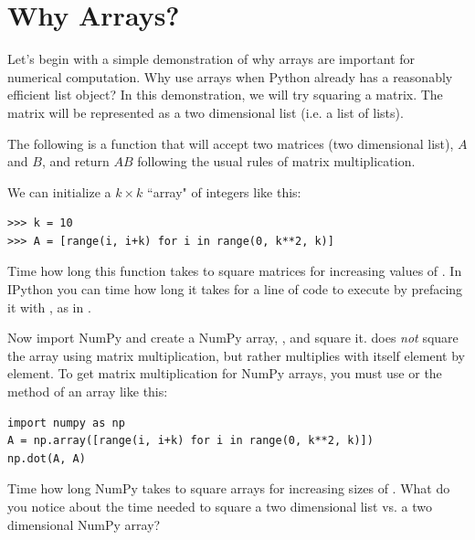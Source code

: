 \label{lab:NumPyArrays}

\section*{Why Arrays?}
Let's begin with a simple demonstration of why arrays are important for numerical computation.
Why use arrays when Python already has a reasonably efficient list object?
In this demonstration, we will try squaring a matrix.
The matrix will be represented as a two dimensional list (i.e. a list of lists).

The following is a function that will accept two matrices (two dimensional list), $A$ and $B$, and return $AB$ following the usual rules of matrix multiplication.

We can initialize a $k \times k$ ``array" of integers like this:
\begin{lstlisting}
>>> k = 10
>>> A = [range(i, i+k) for i in range(0, k**2, k)]
\end{lstlisting}

\begin{problem}
Time how long this function takes to square matrices for increasing values of .
In IPython you can time how long it takes for a line of code to execute by prefacing it with , as in .

Now import NumPy and create a NumPy array, , and square it.
 does \emph{not} square the array using matrix multiplication, but rather multiplies  with itself element by element.
To get matrix multiplication for NumPy arrays, you must use  or the  method of an array like this:
\begin{lstlisting}
import numpy as np
A = np.array([range(i, i+k) for i in range(0, k**2, k)])
np.dot(A, A)
\end{lstlisting}
Time how long NumPy takes to square arrays for increasing sizes of .
What do you notice about the time needed to square a two dimensional list vs. a two dimensional NumPy array?
\end{problem}

